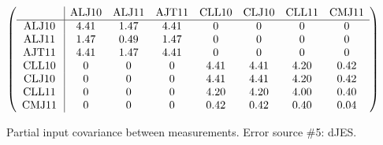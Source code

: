 \begin{table}[H]
\scriptsize
\begin{center}
\renewcommand{\arraystretch}{1.1}
\begin{math}\left(\begin{array}{c|ccccccc}
 & \mathrm{ALJ10} & 
\mathrm{ALJ11} & 
\mathrm{AJT11} & 
\mathrm{CLL10} & 
\mathrm{CLJ10} & 
\mathrm{CLL11} & 
\mathrm{CMJ11} \\
\hline
\mathrm{ALJ10} \hspace*{2pt} &       4.41 &       1.47 &       4.41 &  0 &  0 &  0 &  0 \\
\mathrm{ALJ11} \hspace*{2pt} &       1.47 &       0.49 &       1.47 &  0 &  0 &  0 &  0 \\
\mathrm{AJT11} \hspace*{2pt} &       4.41 &       1.47 &       4.41 &  0 &  0 &  0 &  0 \\
\mathrm{CLL10} \hspace*{2pt} &  0 &  0 &  0 &       4.41 &       4.41 &       4.20 &       0.42 \\
\mathrm{CLJ10} \hspace*{2pt} &  0 &  0 &  0 &       4.41 &       4.41 &       4.20 &       0.42 \\
\mathrm{CLL11} \hspace*{2pt} &  0 &  0 &  0 &       4.20 &       4.20 &       4.00 &       0.40 \\
\mathrm{CMJ11} \hspace*{2pt} &  0 &  0 &  0 &       0.42 &       0.42 &       0.40 &       0.04 \\
\end{array}\right)\end{math}
\caption{Partial input covariance between measurements. Error source \#5: dJES.}
\renewcommand{\arraystretch}{1}
\end{center}
\end{table}
